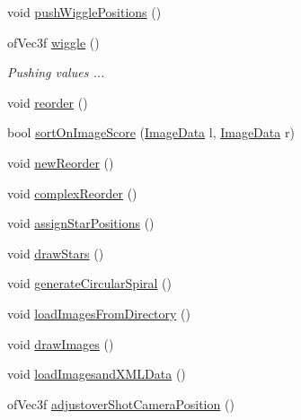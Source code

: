 \begin{DoxyCompactItemize}
\item 
void \hyperlink{classtest_app_aaa5c2175be1d5ca404c3c23a898d0cdd}{push\-Wiggle\-Positions} ()
\item 
of\-Vec3f \hyperlink{classtest_app_acd718eb54b9dc2b45e463414c24de6b9}{wiggle} ()
\begin{DoxyCompactList}\small\item\em Pushing values ... \end{DoxyCompactList}\item 
void \hyperlink{classtest_app_ab3aec1217fe6743f4ec9ed762148f627}{reorder} ()
\item 
bool \hyperlink{classtest_app_a81cf913142d9512f9d1063cb7e71199b}{sort\-On\-Image\-Score} (\hyperlink{struct_image_data}{Image\-Data} l, \hyperlink{struct_image_data}{Image\-Data} r)
\item 
void \hyperlink{classtest_app_a98baf4cdf9fa0f0a56056322b4e7f7e7}{new\-Reorder} ()
\item 
void \hyperlink{classtest_app_abaca61ce3e4c1b6ce726c907915acf80}{complex\-Reorder} ()
\item 
void \hyperlink{classtest_app_a57e6d61c73ba0244b9d7a8c227aec244}{assign\-Star\-Positions} ()
\item 
void \hyperlink{classtest_app_a3ea688a73ca9eb760a3f0a07fde0ac10}{draw\-Stars} ()
\item 
void \hyperlink{classtest_app_aa30f4f1db2d186466f97e6ca15169712}{generate\-Circular\-Spiral} ()
\item 
void \hyperlink{classtest_app_afcb51e1a0b9152b9f6e6b102959bab51}{load\-Images\-From\-Directory} ()
\item 
void \hyperlink{classtest_app_a6dbcb5f1e47c842dfd1ab6b188097677}{draw\-Images} ()
\item 
void \hyperlink{classtest_app_aa93380112b906e2aac2d8738309b2d17}{load\-Imagesand\-X\-M\-L\-Data} ()
\item 
of\-Vec3f \hyperlink{classtest_app_a2a792bfdf269fd69951cbf97d4f574af}{adjustover\-Shot\-Camera\-Position} ()
\end{DoxyCompactItemize}
